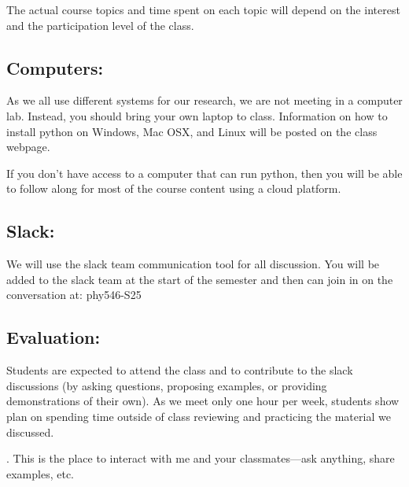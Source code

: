 \documentclass[10pt]{article}
\begin{document}
\noindent The actual course topics and time spent on each topic will depend on the
interest and the participation level of the class.


\subsection*{Computers:}
%
As we all use different systems for our research, we are not meeting
in a computer lab.  Instead, you should bring your own laptop to
class.  Information on how to install python on Windows, Mac OSX, and
Linux will be posted on the class webpage.

\noindent
If you don't have access to a computer that can run python, then you will be
able to follow along for most of the course content using a cloud platform.


\subsection*{Slack:}
%
We will use the slack team communication tool for all discussion.  You
will be added to the slack team at the start of the semester and then
can join in on the conversation at: {\sf phy546-S25}


\subsection*{Evaluation:}

Students are expected to attend the class and to contribute
to the slack discussions (by asking questions, proposing examples, or
providing demonstrations of their own).  As we meet only one hour per
week, students show plan on spending time outside of class reviewing
and practicing the material we discussed.

.  This is the place to interact with
me and your classmates---ask anything, share examples, etc.
\end{document}

